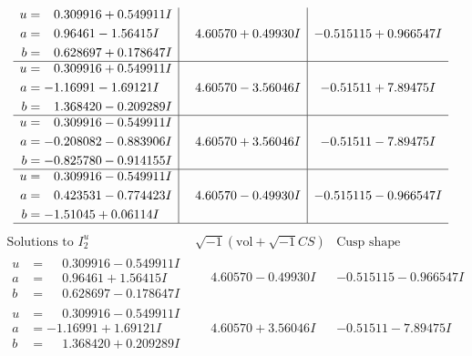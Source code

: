 \documentclass[1p]{elsarticle_modified}
\theoremstyle{definition}
\newcommand{\I}{\sqrt{-1}}
\begin{document}
$$\begin{array}{c|c|c}
\begin{aligned}
u &= \phantom{-}0.309916 + 0.549911 I \\
a &= \phantom{-}0.96461 - 1.56415 I \\
b &= \phantom{-}0.628697 + 0.178647 I\end{aligned}
 & \phantom{-}4.60570 + 0.49930 I & -0.515115 + 0.966547 I \\ \hline\begin{aligned}
u &= \phantom{-}0.309916 + 0.549911 I \\
a &= -1.16991 - 1.69121 I \\
b &= \phantom{-}1.368420 - 0.209289 I\end{aligned}
 & \phantom{-}4.60570 - 3.56046 I & -0.51511 + 7.89475 I \\ \hline\begin{aligned}
u &= \phantom{-}0.309916 - 0.549911 I \\
a &= -0.208082 - 0.883906 I \\
b &= -0.825780 - 0.914155 I\end{aligned}
 & \phantom{-}4.60570 + 3.56046 I & -0.51511 - 7.89475 I \\ \hline\begin{aligned}
u &= \phantom{-}0.309916 - 0.549911 I \\
a &= \phantom{-}0.423531 - 0.774423 I \\
b &= -1.51045 + 0.06114 I\end{aligned}
 & \phantom{-}4.60570 - 0.49930 I & -0.515115 - 0.966547 I\\
 \hline 
 \end{array}$$\newpage$$\begin{array}{c|c|c}  
\text{Solutions to }I^u_{2}& \I (\text{vol} + \sqrt{-1}CS) & \text{Cusp shape}\\
 \hline 
\begin{aligned}
u &= \phantom{-}0.309916 - 0.549911 I \\
a &= \phantom{-}0.96461 + 1.56415 I \\
b &= \phantom{-}0.628697 - 0.178647 I\end{aligned}
 & \phantom{-}4.60570 - 0.49930 I & -0.515115 - 0.966547 I \\ \hline\begin{aligned}
u &= \phantom{-}0.309916 - 0.549911 I \\
a &= -1.16991 + 1.69121 I \\
b &= \phantom{-}1.368420 + 0.209289 I\end{aligned}
 & \phantom{-}4.60570 + 3.56046 I & -0.51511 - 7.89475 I \\ \hline\begin{aligned}

\end{aligned}
\end{array}$$
\end{document}
